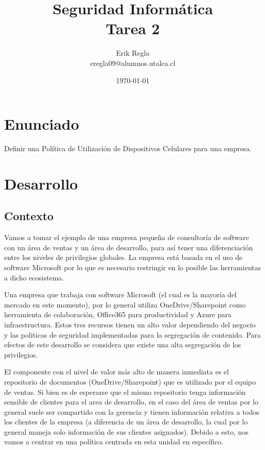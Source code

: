 \documentclass[11pt]{utalcaDoc}
\title{{\bf Seguridad Informática}\\ Tarea 2}
\author{Erik Regla\\ eregla09@alumnos.utalca.cl}
\date{\today}
\begin{document}
\maketitle

\section{Enunciado}
Definir una Política de Utilización de Dispositivos Celulares para una empresa.

\section{Desarrollo}

\subsection{ Contexto }
Vamos a tomar el ejemplo de una empresa pequeña de consultoría de software con un área de ventas y un área de desarrollo, para así tener una diferenciación entre los niveles de privilegios globales. La empresa está basada en el uso de software Microsoft por lo que es necesario restringir en lo posible las herramientas a dicho ecosistema.

Una empresa que trabaja con software Microsoft (el cual es la mayoría del mercado en este momento), por lo general utiliza OneDrive/Sharepoint como herramienta de colaboración, Office365 para productividad y Azure para infraestructura. Estos tres recursos tienen un alto valor dependiendo del negocio y las politicas de seguridad implementadas para la segregación de contenido. Para efectos de este desarrollo se considera que existe una alta segregación de los privilegios.

El componente con el nivel de valor más alto de manera inmediata es el repositorio de documentos (OneDrive/Sharepoint) que es utilizado por el equipo de ventas. Si bien es de esperarse que el mismo repositorio tenga información sensible de clientes para el area de desarrollo, en el caso del área de ventas por lo general suele ser compartido con la gerencia y tienen información relativa a todos los clientes de la empresa (a diferencia de un área de desarrollo, la cual por lo general maneja solo información de sus clientes asignados). Debido a esto, nos vamos a centrar en una política centrada en esta unidad en específico.
\end{document}
